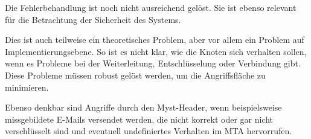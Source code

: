 Die Fehlerbehandlung ist noch nicht ausreichend gelöst. Sie ist ebenso relevant für die Betrachtung der Sicherheit des Systems.

Dies ist auch teilweise ein theoretisches Problem, aber vor allem ein Problem auf Implementierungsebene. So ist es nicht klar, wie die Knoten sich verhalten sollen, wenn es Probleme bei der Weiterleitung, Entschlüsselung oder Verbindung gibt. Diese Probleme müssen robust gelöst werden, um die Angriffsfläche zu minimieren.

Ebenso denkbar sind Angriffe durch den Myst-Header, wenn beispielsweise missgebildete E-Mails versendet werden, die nicht korrekt oder gar nicht verschlüsselt sind und eventuell undefiniertes Verhalten im MTA hervorrufen.